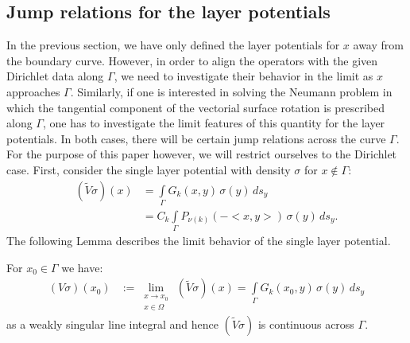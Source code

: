 \documentclass[final]{siamltex}
\newcommand{\C}{C_k}
\begin{document}
\subsection{Jump relations for the layer potentials} 
In the previous section, we have only defined the layer potentials for
$x$ away from the boundary curve. However, in order to align the
operators with the given Dirichlet data along $\Gamma$, we need to
investigate their behavior in the limit as $x$ approaches $\Gamma$.
Similarly, if one is interested in solving the Neumann problem in which
the tangential component of the vectorial surface rotation is
prescribed along $\Gamma$, one has to investigate the limit features of
this quantity for the layer potentials. In both cases, there will be
certain jump relations across the curve $\Gamma$. For the purpose of
this paper however, we will restrict ourselves to the Dirichlet case.
First, consider the single layer potential with density $\sigma$ for $x
\notin \Gamma$:
\begin{align*}
  (\widetilde{V}\sigma)(x) & =  \int\limits_\Gamma
  G_k(x,y)\,\sigma(y)\,ds_{y} \\
  & = \C \int\limits_\Gamma P_{\nu(k)}(-<x,y>)\,\sigma(y)\,ds_{y}.
\end{align*}
The following Lemma describes the limit behavior of the single layer potential.
\begin{lemma}
For $x_{0}\in\Gamma$ we have:
\begin{align*} 
  (V\sigma)(x_0) & := \lim\limits_{\substack{
      x \to x_{0} \\ x \in \Omega}}
  \,(\widetilde{V}\sigma)(x) = \int\limits_\Gamma G_k(x_{0},y)\,\sigma(y)\,ds_{y}
\end{align*}
as a weakly singular line integral and hence $(\widetilde{V}\sigma)$ is continuous across $\Gamma$.
\end{lemma}
\end{document}
